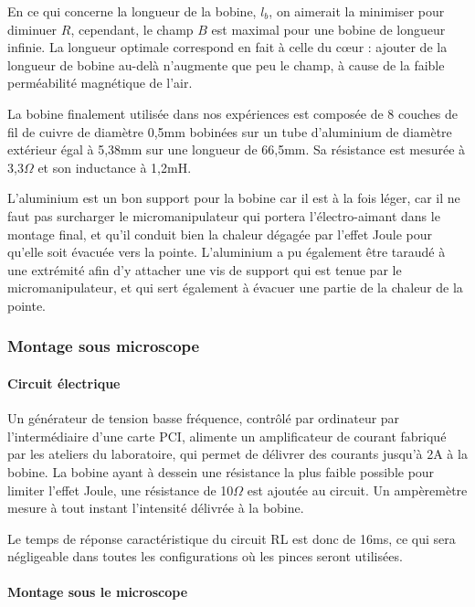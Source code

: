 		En ce qui concerne la longueur de la bobine, $l_b$, on aimerait la minimiser pour diminuer $R$, cependant, le champ $B$ est maximal pour une bobine de longueur infinie. La longueur optimale correspond en fait à celle du c\oe ur : ajouter de la longueur de bobine au-delà n'augmente que peu le champ, à cause de la faible perméabilité magnétique de l'air.
		
		La bobine finalement utilisée dans nos expériences est composée de 8 couches de fil de cuivre de diamètre 0,5mm bobinées sur un tube d'aluminium de diamètre extérieur égal à 5,38mm sur une longueur de 66,5mm. Sa résistance est mesurée à 3,3$\Omega$ et son inductance à 1,2mH. 
		
		L'aluminium est un bon support pour la bobine car il est à la fois léger, car il ne faut pas surcharger le micromanipulateur qui portera l'électro-aimant dans le montage final, et qu'il conduit bien la chaleur dégagée par l'effet Joule pour qu'elle soit évacuée vers la pointe. L'aluminium a pu également être taraudé à une extrémité afin d'y attacher une vis de support qui est tenue par le micromanipulateur, et qui sert également à évacuer une partie de la chaleur de la pointe.                       
		\subsubsection{Montage sous microscope}
		\paragraph{Circuit électrique}
		
		Un générateur de tension basse fréquence, contrôlé par ordinateur par l'intermédiaire d'une carte PCI, alimente un amplificateur de courant fabriqué par les ateliers du laboratoire, qui permet de délivrer des courants jusqu'à 2A à la bobine. 
		La bobine ayant à dessein une résistance la plus faible possible pour limiter l'effet Joule, une résistance de 10$\Omega$ est ajoutée au circuit. Un ampèremètre mesure à tout instant l'intensité délivrée à la bobine. 
		
		Le temps de réponse caractéristique du circuit RL est donc de 16ms, ce qui sera négligeable dans toutes les configurations où les pinces seront utilisées. 
		
		 \paragraph{Montage sous le microscope}
		 

